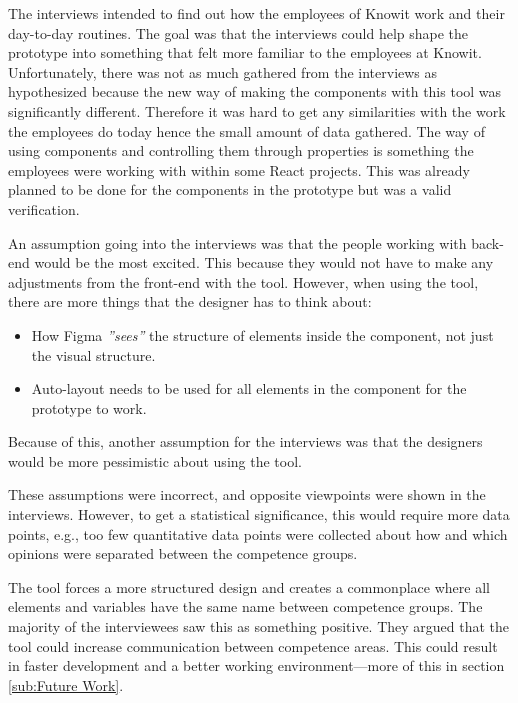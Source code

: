 The interviews intended to find out how the employees of Knowit work and their day-to-day routines. The goal was that the interviews could help shape the prototype into something that felt more familiar to the employees at Knowit. Unfortunately, there was not as much gathered from the interviews as hypothesized because the new way of making the components with this tool was significantly different. Therefore it was hard to get any similarities with the work the employees do today hence the small amount of data gathered. The way of using components and controlling them through properties is something the employees were working with within some React projects. This was already planned to be done for the components in the prototype but was a valid verification. 

An assumption going into the interviews was that the people working with back-end would be the most excited. This because they would not have to make any adjustments from the front-end with the tool. However, when using the tool, there are more things that the designer has to think about:
\begin{itemize}
  \item How Figma \textit{''sees''} the structure of elements inside the component, not just the visual structure.
  \item Auto-layout needs to be used for all elements in the component for the prototype to work. 
\end{itemize}

Because of this, another assumption for the interviews was that the designers would be more pessimistic about using the tool. 


These assumptions were incorrect, and opposite viewpoints were shown in the interviews. However, to get a statistical significance, this would require more data points, e.g., too few quantitative data points were collected about how and which opinions were separated between the competence groups. 

 The tool forces a more structured design and creates a commonplace where all elements and variables have the same name between competence groups. The majority of the interviewees saw this as something positive. They argued that the tool could increase communication between competence areas. This could result in faster development and a better working environment—more of this in section \ref{sub:Future Work}.


